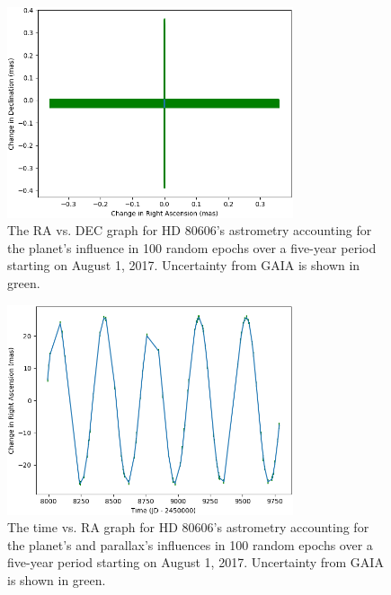 \documentclass[12pt]{article}
\begin{document}
\begin{figure}[H]
\centering
\includegraphics[width=0.75\textwidth]{planet_ra_dec.png}
\vspace{-1em}
\caption{The RA vs. DEC graph for HD 80606's astrometry accounting for the planet's influence in 100 random epochs over a five-year period starting on August 1, 2017. Uncertainty from GAIA is shown in green.}
\end{figure}
\vspace{-1em}
\begin{figure}[H]
\centering
\includegraphics[width=0.75\textwidth]{parallax_time_ra.png}
\vspace{-1em}
\caption{The time vs. RA graph for HD 80606's astrometry accounting for the planet's and parallax's influences in 100 random epochs over a five-year period starting on August 1, 2017. Uncertainty from GAIA is shown in green.}
\end{figure}
\vspace{-1em}
\end{document}
